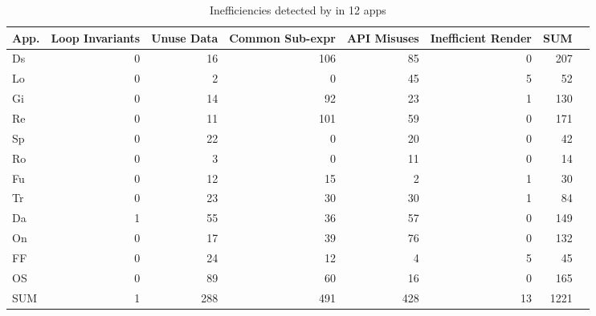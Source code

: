 \begin{table}
\centering
\caption{Inefficiencies detected by \Tool in 12 apps}
{\small
\label{tab:perfbug}
\begin{tabular}{lrrrrrrr}
\toprule													
App.	&	Loop   Invariants	&	Unuse  Data	&	Common  Sub-expr	&	API   Misuses	&	Inefficient Render	&	SUM	\\
\midrule													
Ds	&	0	&	16	&	106	&	85	&	0	&	207	\\
\midrule													
Lo	&	0	&	2	&	0	&	45	&	5	&	52	\\
\midrule													
Gi	&	0	&	14	&	92	&	23	&	1	&	130	\\
\midrule													
Re	&	0	&	11	&	101	&	59	&	0	&	171	\\
\midrule													
Sp	&	0	&	22	&	0	&	20	&	0	&	42	\\
\midrule													
Ro	&	0	&	3	&	0	&	11	&	0	&	14	\\
\midrule													
Fu	&	0	&	12	&	15	&	2	&	1	&	30	\\
\midrule													
Tr	&	0	&	23	&	30	&	30	&	1	&	84	\\
\midrule													
Da	&	1	&	55	&	36	&	57	&	0	&	149	\\
\midrule													
On	&	0	&	17	&	39	&	76	&	0	&	132	\\
\midrule													
FF	&	0	&	24	&	12	&	4	&	5	&	45	\\
\midrule													
OS	&	0	&	89	&	60	&	16	&	0	&	165	\\
\midrule													
SUM	&	1	&	288	&	491	&	428	&	13	&	1221	\\					
\bottomrule															
\end{tabular}
}
\end{table}